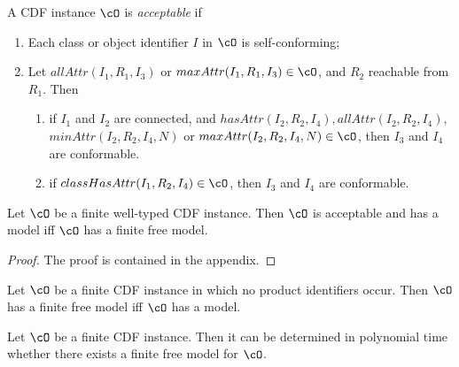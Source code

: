 \begin{definition} \label{def:acceptable}
A CDF instance $\cO$ is {\em acceptable} if
\begin{enumerate}
\item Each class or object identifier $I$ in $\cO$ is self-conforming; 


\item Let $allAttr(I_1,R_1,I_3)$ or $maxAttr(I_1,R_1,I_3) \in \cO$,
and $R_2$ reachable from $R_1$.  Then 
\begin{enumerate}
\item if $I_1$ and $I_2$ are connected, and $hasAttr(I_2,R_2,I_4), 
allAttr(I_2,R_2,I_4),$ $minAttr(I_2,R_2,I_4,N)$ or
$maxAttr(I_2,R_2,I_4,N) \in \cO$, then $I_3$ and $I_4$ are
conformable.
%
\item if $classHasAttr(I_1,R_2,I_4) \in \cO$, then $I_3$ and $I_4$ are
conformable. 
\end{enumerate}
\end{enumerate}
\end{definition}

\begin{theorem} \label{thm:acceptable}
Let $\cO$ be a finite well-typed CDF instance.  Then $\cO$ is
acceptable and has a model iff $\cO$ has a finite free model.
\end{theorem}
\begin{proof}
The proof is contained in the appendix.
\end{proof}

\begin{corollary} \label{thm:atomic}
Let $\cO$ be a finite CDF instance in which no product identifiers
occur.  Then $\cO$ has a finite free model iff $\cO$ has a model.
\end{corollary}


\begin{theorem} \label{thm:poly}
Let $\cO$ be a finite CDF instance.  Then it can be determined in
polynomial time whether there exists a finite free model for $\cO$.
\end{theorem}

